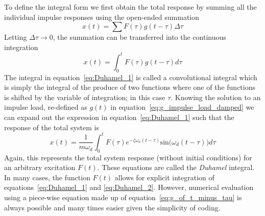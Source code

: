 \documentclass[12pt,letter]{article}
\begin{document}
To define the integral form we first obtain the total response by summing all the individual impulse responses using the open-ended summation
\begin{equation}
	x(t) = \sum F( \tau ) g(t- \tau ) \Delta \tau
\end{equation}
Letting $\Delta \tau \rightarrow 0$, the summation can be transferred into the continuous integration  
\begin{equation}
	x(t) = \int_{0}^{t} F( \tau ) g(t- \tau ) d \tau
	\label{eq:Duhamel_1}	
\end{equation}
The integral in equation~\ref{eq:Duhamel_1} is called a convolutional integral which is simply the integral of the produce of two functions where one of the functions is shifted by the variable of integration; in this case $\tau$. Knowing the solution to an impulse load, re-defined as $g(t)$ in equation~\ref{eq:g_impulse_load_damped} we can expand out the expression in equation~\ref{eq:Duhamel_1} such that the response of the total system is
\begin{equation}
	x(t) = \frac{1}{m \omega_d} \int_{0}^{t} F(\tau) e^{-\zeta \omega_n (t-\tau)} \text{sin}\big(\omega_d(t-\tau)\big) d \tau
	\label{eq:Duhamel_2}	
\end{equation}
Again, this represents the total system response (without initial conditions) for an arbitrary excitation $F(t)$.  These equations are called the \textit{Duhamel} integral. In many cases, the function $F(t)$ allows for explicit integration of equations~\ref{eq:Duhamel_1} and \ref{eq:Duhamel_2}. However, numerical evaluation using a piece-wise equation made up of equation~\ref{eq:g_of_t_minus_tau} is always possible and many times easier given the simplicity of coding. 

\pagebreak
\end{document}
